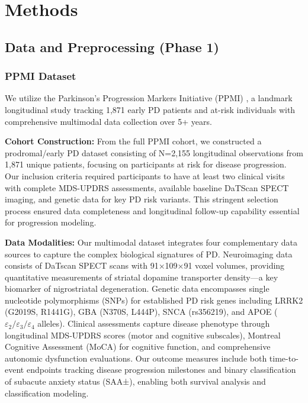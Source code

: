 \documentclass[conference]{IEEEtran}
\begin{document}
\section{Methods}
\label{sec:methods}

\subsection{Data and Preprocessing (Phase 1)}

\subsubsection{PPMI Dataset}
We utilize the Parkinson's Progression Markers Initiative (PPMI) \cite{marek2011ppmi}, a landmark longitudinal study tracking 1,871 early PD patients and at-risk individuals with comprehensive multimodal data collection over 5+ years.


\textbf{Cohort Construction:} From the full PPMI cohort, we constructed a prodromal/early PD dataset consisting of N=2,155 longitudinal observations from 1,871 unique patients, focusing on participants at risk for disease progression. Our inclusion criteria required participants to have at least two clinical visits with complete MDS-UPDRS assessments, available baseline DaTScan SPECT imaging, and genetic data for key PD risk variants. This stringent selection process ensured data completeness and longitudinal follow-up capability essential for progression modeling.

\textbf{Data Modalities:} Our multimodal dataset integrates four complementary data sources to capture the complex biological signatures of PD. Neuroimaging data consists of DaTscan SPECT scans with 91×109×91 voxel volumes, providing quantitative measurements of striatal dopamine transporter density—a key biomarker of nigrostriatal degeneration. Genetic data encompasses single nucleotide polymorphisms (SNPs) for established PD risk genes including LRRK2 (G2019S, R1441G), GBA (N370S, L444P), SNCA (rs356219), and APOE ($\varepsilon_2 / \varepsilon_3 / \varepsilon_4$ alleles). Clinical assessments capture disease phenotype through longitudinal MDS-UPDRS scores (motor and cognitive subscales), Montreal Cognitive Assessment (MoCA) for cognitive function, and comprehensive autonomic dysfunction evaluations. Our outcome measures include both time-to-event endpoints tracking disease progression milestones and binary classification of subacute anxiety status (SAA±), enabling both survival analysis and classification modeling.
\end{document}
